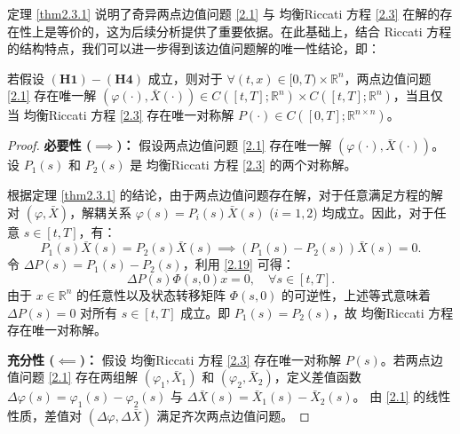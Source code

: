 \documentclass{GZUbachelorthesis}
\begin{document}
\vspace{1em}
定理 \ref{thm2.3.1} 说明了奇异两点边值问题 \eqref{2.1} 与 均衡Riccati 方程 \eqref{2.3} 在解的存在性上是等价的，这为后续分析提供了重要依据。在此基础上，结合 Riccati 方程的结构特点，我们可以进一步得到该边值问题解的唯一性结论，即：
\vspace{1em}
\begin{thm}[两点边值问题与均衡Riccati方程的等价性]\label{thm2.3.5}
	若假设 $\mathbf{(H1)-(H4)}$ 成立，则对于 $\forall (t,x)\in [0,T)\times\mathbb{R}^n$，两点边值问题 \eqref{2.1} 存在唯一解 $(\varphi(\cdot),\bar{X}(\cdot)) \in C([t,T];\mathbb{R}^n)\times C([t,T];\mathbb{R}^n)$，当且仅当 均衡Riccati 方程 \eqref{2.3} 存在唯一对称解 $P(\cdot) \in C([0,T];\mathbb{R}^{n\times n})$。
\end{thm}
\begin{proof}
	\textbf{必要性 ($\implies$)：}
	假设两点边值问题 \eqref{2.1} 存在唯一解 $(\varphi(\cdot), \bar{X}(\cdot))$。设 $P_1(s)$ 和 $P_2(s)$ 是 均衡Riccati 方程 \eqref{2.3} 的两个对称解。
	
	根据定理 \ref{thm2.3.1} 的结论，由于两点边值问题存在解，对于任意满足方程的解对 $(\varphi, \bar{X})$，解耦关系 $\varphi(s) = P_i(s)\bar{X}(s)$ ($i=1,2$) 均成立。因此，对于任意 $s \in [t, T]$，有：
	\begin{equation*}
		P_1(s)\bar{X}(s) = P_2(s)\bar{X}(s) \implies (P_1(s) - P_2(s))\bar{X}(s) = 0.
	\end{equation*}
	令 $\Delta P(s) = P_1(s) - P_2(s)$，利用 \eqref{2.19} 可得：
	\begin{equation}\label{3.78}
		\Delta P(s) \Phi(s,0)x = 0, \quad \forall s \in [t, T].
	\end{equation}
	由于 $x \in \mathbb{R}^n$ 的任意性以及状态转移矩阵 $\Phi(s,0)$ 的可逆性，上述等式意味着 $\Delta P(s) = 0$ 对所有 $s \in [t, T]$ 成立。即 $P_1(s) = P_2(s)$，故 均衡Riccati 方程存在唯一对称解。
	
	\textbf{充分性 ($\impliedby$)：}
	假设 均衡Riccati 方程 \eqref{2.3} 存在唯一对称解 $P(s)$。若两点边值问题 \eqref{2.1} 存在两组解 $(\varphi_1, \bar{X}_1)$ 和 $(\varphi_2, \bar{X}_2)$，定义差值函数 $\Delta \varphi(s) = \varphi_1(s) - \varphi_2(s)$ 与 $\Delta \bar{X}(s) = \bar{X}_1(s) - \bar{X}_2(s)$。
	由 \eqref{2.1} 的线性性质，差值对 $(\Delta \varphi, \Delta \bar{X})$ 满足齐次两点边值问题。
	

\end{proof}
\end{document}
